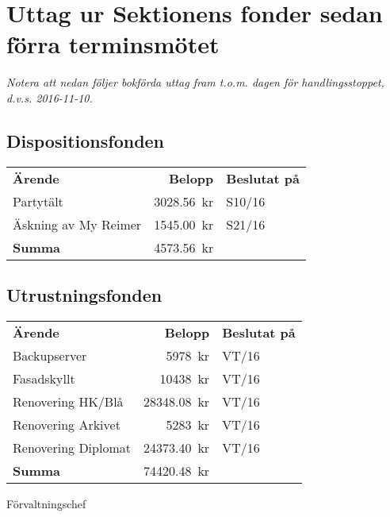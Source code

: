 \documentclass[../_main/handlingar.tex]{subfiles}
\begin{document}
\section{Uttag ur Sektionens fonder sedan förra terminsmötet}

\emph{Notera att nedan följer bokförda uttag fram t.o.m. dagen för handlingsstoppet, d.v.s. 2016-11-10.}

\subsection*{Dispositionsfonden}
\begin{tabular}{l r l}
    \textbf{Ärende} & \textbf{Belopp} & \textbf{Beslutat på} \\
    Partytält & \SI{3028.56}{kr} & S10/16 \\
    Äskning av My Reimer & \SI{1545.00}{kr} & S21/16 \\
    \hline
    \textbf{Summa} & \SI{4573.56}{kr} \\
\end{tabular}

\subsection*{Utrustningsfonden}
\begin{tabular}{l r l}
    \textbf{Ärende} & \textbf{Belopp} & \textbf{Beslutat på} \\
    Backupserver & \SI{5978}{kr} & VT/16 \\
    Fasadskyllt & \SI{10438}{kr} & VT/16 \\
    Renovering HK/Blå & \SI{28348.08}{kr} & VT/16 \\
    Renovering Arkivet & \SI{5283}{kr} & VT/16 \\
    Renovering Diplomat & \SI{24373.40}{kr} & VT/16 \\
    \hline
    \textbf{Summa} & \SI{74420.48}{kr} \\
\end{tabular}

\begin{signatures}{1}
    \ist
    \signature{Anders Nilsson}{Förvaltningschef}
\end{signatures}
\end{document}
